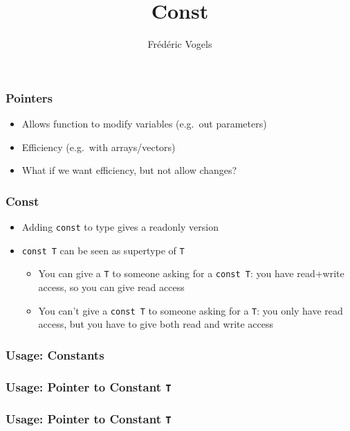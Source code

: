 \documentclass{../ucll-slides}
\title{Const}
\author{Fr\'ed\'eric Vogels}
\begin{document}
\begin{frame}
  \titlepage
\end{frame}

\begin{frame}
  \frametitle{Pointers}
  \begin{itemize}
    \item Allows function to modify variables (e.g.\ out parameters)
    \item Efficiency (e.g.\ with arrays/vectors)
  \end{itemize}
  \vskip5mm
  \begin{itemize}
    \item What if we want efficiency, but not allow changes?
  \end{itemize}
\end{frame}

\begin{frame}
  \frametitle{Const}
  \begin{itemize}
    \item Adding {\tt const} to type gives a readonly version
    \item {\tt const T} can be seen as supertype of {\tt T}
      \begin{itemize}
        \item You can give a {\tt T} to someone asking for a {\tt const T}:
              you have read+write access, so you can give read access
        \item You can't give a {\tt const T} to someone asking for a {\tt T}:
              you only have read access, but you have to give both read and write access
      \end{itemize}
  \end{itemize}
\end{frame}

\begin{frame}
  \frametitle{Usage: Constants}
\end{frame}

\begin{frame}
  \frametitle{Usage: Pointer to Constant {\tt T}}
\end{frame}

\begin{frame}
  \frametitle{Usage: Pointer to Constant {\tt T}}
\end{frame}
\end{document}

